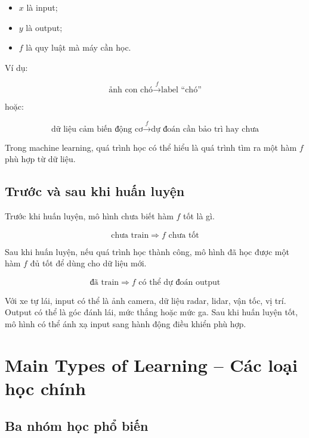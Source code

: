 \begin{itemize}
    \item $x$ là input;
    \item $y$ là output;
    \item $f$ là quy luật mà máy cần học.
\end{itemize}

Ví dụ:

\[
    \text{ảnh con chó}
    \xrightarrow{f}
    \text{label ``chó''}
\]

hoặc:

\[
    \text{dữ liệu cảm biến động cơ}
    \xrightarrow{f}
    \text{dự đoán cần bảo trì hay chưa}
\]

\begin{ghinho}
Trong machine learning, quá trình học có thể hiểu là quá trình tìm ra một hàm $f$ phù hợp từ dữ liệu.
\end{ghinho}

\subsection{Trước và sau khi huấn luyện}

Trước khi huấn luyện, mô hình chưa biết hàm $f$ tốt là gì.

\[
    \text{chưa train}
    \Rightarrow
    f \text{ chưa tốt}
\]

Sau khi huấn luyện, nếu quá trình học thành công, mô hình đã học được một hàm $f$ đủ tốt để dùng cho dữ liệu mới.

\[
    \text{đã train}
    \Rightarrow
    f \text{ có thể dự đoán output}
\]

\begin{vidu}
Với xe tự lái, input có thể là ảnh camera, dữ liệu radar, lidar, vận tốc, vị trí. Output có thể là góc đánh lái, mức thắng hoặc mức ga. Sau khi huấn luyện tốt, mô hình có thể ánh xạ input sang hành động điều khiển phù hợp.
\end{vidu}

\section{Main Types of Learning -- Các loại học chính}

\subsection{Ba nhóm học phổ biến}

